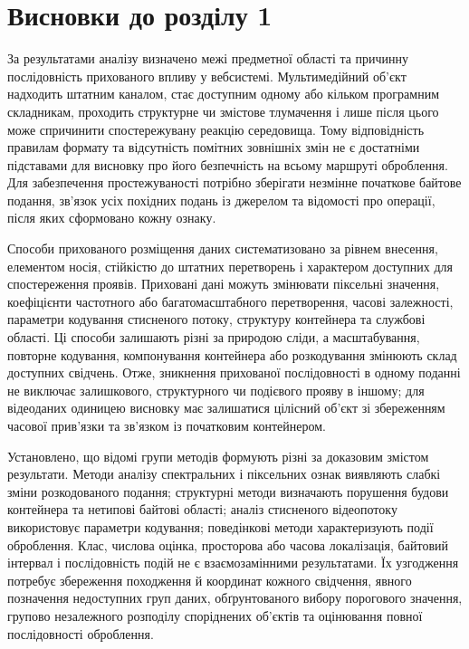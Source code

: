 \section*{Висновки до розділу 1}
{}

За результатами аналізу визначено межі предметної області та причинну послідовність прихованого впливу у вебсистемі. Мультимедійний об’єкт надходить штатним каналом, стає доступним одному або кільком програмним складникам, проходить структурне чи змістове тлумачення і лише після цього може спричинити спостережувану реакцію середовища. Тому відповідність правилам формату та відсутність помітних зовнішніх змін не є достатніми підставами для висновку про його безпечність на всьому маршруті оброблення. Для забезпечення простежуваності потрібно зберігати незмінне початкове байтове подання, зв’язок усіх похідних подань із джерелом та відомості про операції, після яких сформовано кожну ознаку.

Способи прихованого розміщення даних систематизовано за рівнем внесення, елементом носія, стійкістю до штатних перетворень і характером доступних для спостереження проявів. Приховані дані можуть змінювати піксельні значення, коефіцієнти частотного або багатомасштабного перетворення, часові залежності, параметри кодування стисненого потоку, структуру контейнера та службові області. Ці способи залишають різні за природою сліди, а масштабування, повторне кодування, компонування контейнера або розкодування змінюють склад доступних свідчень. Отже, зникнення прихованої послідовності в одному поданні не виключає залишкового, структурного чи подієвого прояву в іншому; для відеоданих одиницею висновку має залишатися цілісний об’єкт зі збереженням часової прив’язки та зв’язком із початковим контейнером.

Установлено, що відомі групи методів формують різні за доказовим змістом результати. Методи аналізу спектральних і піксельних ознак виявляють слабкі зміни розкодованого подання; структурні методи визначають порушення будови контейнера та нетипові байтові області; аналіз стисненого відеопотоку використовує параметри кодування; поведінкові методи характеризують події оброблення. Клас, числова оцінка, просторова або часова локалізація, байтовий інтервал і послідовність подій не є взаємозамінними результатами. Їх узгодження потребує збереження походження й координат кожного свідчення, явного позначення недоступних груп даних, обґрунтованого вибору порогового значення, групово незалежного розподілу споріднених об’єктів та оцінювання повної послідовності оброблення.

